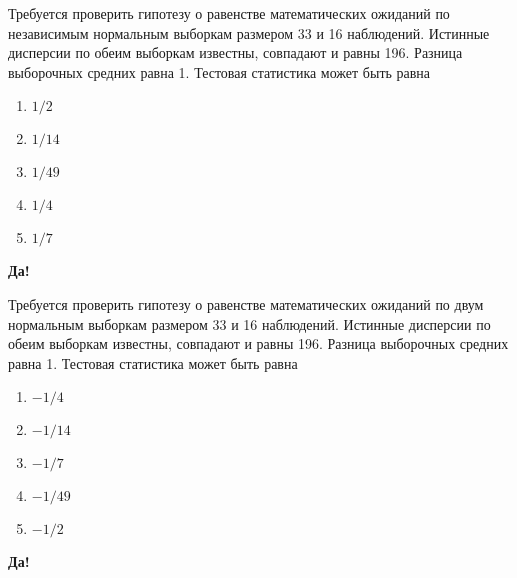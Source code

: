 \documentclass[t]{beamer}
\begin{document}
 \begin{frame} \label{9-Yes} 
\begin{block}{9} 

  Требуется проверить гипотезу о равенстве математических ожиданий по независимым нормальным выборкам размером 33 и 16 наблюдений. Истинные дисперсии по обеим выборкам известны, совпадают и равны 196. Разница выборочных средних равна 1. Тестовая статистика может быть равна


 \end{block} 
\begin{enumerate} 
\item[] \hyperlink{9-No}{\beamergotobutton{} $1/2$}
\item[] \hyperlink{9-No}{\beamergotobutton{} $1/14$}
\item[] \hyperlink{9-No}{\beamergotobutton{} $1/49$}
\item[] \hyperlink{9-Yes}{\beamergotobutton{} $1/4$}
\item[] \hyperlink{9-No}{\beamergotobutton{} $1/7$}
\end{enumerate} 

 \textbf{Да!} 
 \hyperlink{10}{}\end{frame} 


 \begin{frame} \label{10-Yes} 
\begin{block}{10} 

  Требуется проверить гипотезу о равенстве математических ожиданий по двум нормальным выборкам размером 33 и 16 наблюдений. Истинные дисперсии по обеим выборкам известны, совпадают и равны 196. Разница выборочных средних равна 1. Тестовая статистика может быть равна


 \end{block} 
\begin{enumerate} 
\item[] \hyperlink{10-No}{\beamergotobutton{} $-1/4$}
\item[] \hyperlink{10-No}{\beamergotobutton{} $-1/14$}
\item[] \hyperlink{10-No}{\beamergotobutton{} $-1/7$}
\item[] \hyperlink{10-No}{\beamergotobutton{} $-1/49$}
\item[] \hyperlink{10-Yes}{\beamergotobutton{} $-1/2$}
\end{enumerate} 

 \textbf{Да!} 
 \hyperlink{11}{}\end{frame} 
\end{document}
